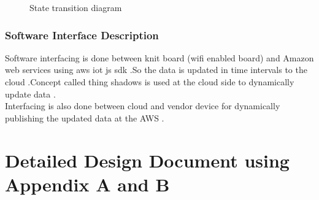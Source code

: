\documentclass[oneside,a4paper,12pt]{report}
\begin{document}
\begin{center}
	\begin{figure}[!htbp]
		\centering
	  \caption{State transition diagram}
	  \label{fig:state-dig}
	\end{figure}
\end{center} 
\newpage
 \subsection{Software Interface Description}	 
Software interfacing is done between knit board (wifi enabled board) and Amazon web services  using aws iot js sdk .So the data is updated in time intervals to the cloud .Concept called thing shadows is used at the cloud side to dynamically update data .\\
Interfacing is also done between cloud and vendor device for dynamically publishing the updated data at the AWS .


\chapter{Detailed Design Document using Appendix A and B}
\end{document}
